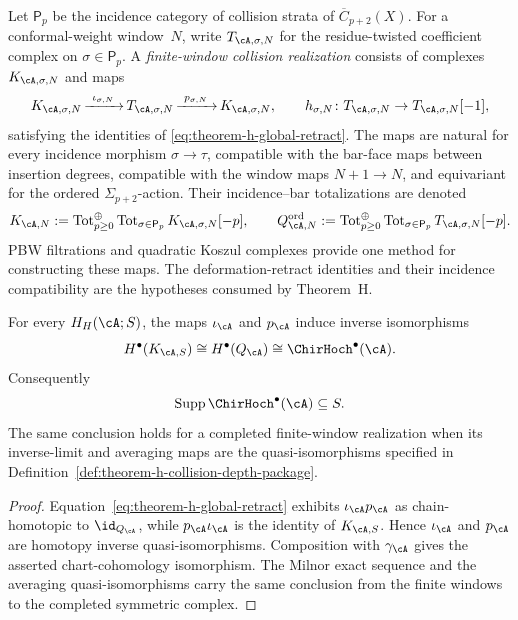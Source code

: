 \begin{definition}
\label{def:theorem-h-pbw-finite-window-lane}
Let \(\mathsf P_{p}\) be the incidence category of collision strata
of \(\overline C_{p+2}(X)\).  For a conformal-weight window~\(N\),
write \(T_{\cA,\sigma,N}\) for the residue-twisted coefficient
complex on \(\sigma\in\mathsf P_p\).  A
\emph{finite-window collision realization} consists of complexes
\(K_{\cA,\sigma,N}\) and maps
\[
 K_{\cA,\sigma,N}
 \mathop{\xrightarrow{\ \iota_{\sigma,N}\ }}
 T_{\cA,\sigma,N}
 \mathop{\xrightarrow{\ p_{\sigma,N}\ }}
 K_{\cA,\sigma,N},
 \qquad h_{\sigma,N}\colon
 T_{\cA,\sigma,N}\to T_{\cA,\sigma,N}[-1],
\]
satisfying the identities of
\eqref{eq:theorem-h-global-retract}.  The maps are natural for every
incidence morphism \(\sigma\to\tau\), compatible with the bar-face
maps between insertion degrees, compatible with the window maps
\(N+1\to N\), and equivariant for the ordered
\(\Sigma_{p+2}\)-action.  Their incidence--bar totalizations are
denoted
\[
 K_{\cA,N}:=\operatorname{Tot}^{\oplus}_{p\geq0}
 \operatorname{Tot}_{\sigma\in\mathsf P_p}
 K_{\cA,\sigma,N}[-p],
 \qquad
 Q^{\mathrm{ord}}_{\cA,N}:=
 \operatorname{Tot}^{\oplus}_{p\geq0}
 \operatorname{Tot}_{\sigma\in\mathsf P_p}
 T_{\cA,\sigma,N}[-p].
\]
PBW filtrations and quadratic Koszul complexes provide one method for
constructing these maps.  The deformation-retract identities and
their incidence compatibility are the hypotheses consumed by
Theorem~H.
\end{definition}

\begin{proposition}
\label{prop:theorem-h-kdh-criterion}
For every \(H_H(\cA;S)\), the maps \(\iota_\cA\) and \(p_\cA\)
induce inverse isomorphisms
\[
 H^\bullet(K_{\cA,S})
 \cong H^\bullet(Q_\cA)
 \cong \ChirHoch^\bullet(\cA).
\]
Consequently
\[
 \operatorname{Supp}\ChirHoch^\bullet(\cA)
 \subseteq S.
\]
The same conclusion holds for a completed finite-window realization
when its inverse-limit and averaging maps are the quasi-isomorphisms
specified in Definition~\ref{def:theorem-h-collision-depth-package}.
\end{proposition}

\begin{proof}
Equation~\eqref{eq:theorem-h-global-retract} exhibits
\(\iota_\cA p_\cA\) as chain-homotopic to
\(\id_{Q_\cA}\), while \(p_\cA\iota_\cA\) is the identity of
\(K_{\cA,S}\).  Hence \(\iota_\cA\) and \(p_\cA\) are homotopy
inverse quasi-isomorphisms.  Composition with \(\gamma_\cA\) gives
the asserted chart-cohomology isomorphism.  The Milnor exact sequence
and the averaging quasi-isomorphisms carry the same conclusion from
the finite windows to the completed symmetric complex.
\end{proof}

